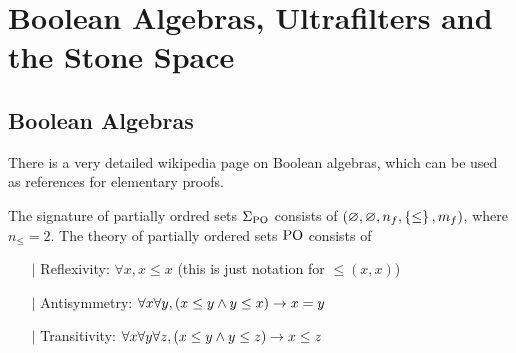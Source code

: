 \section{Boolean Algebras, Ultrafilters and the Stone Space}
\subsection{Boolean Algebras}
There is a very detailed wikipedia page \cite{wiki0} on Boolean algebras,
which can be used as references for elementary proofs.

\begin{dfn}
    The signature of partially ordred sets $\Sigma_{\mathrm{PO}}$ consists of 
    $(\varnothing,\varnothing ,n_f,\left\{\leq\right\},m_f)$,
    where $n_\leq = 2$.
    The theory of partially ordered sets $\mathrm{PO}$ consists of 
    \begin{itemize}
        \item[$\vert$] Reflexivity: 
            $\forall x, 
            x \leq x$ (this is just notation for $\leq(x,x)$)
        \item[$\vert$] Antisymmetry: 
            $\forall x \forall y, 
            (x \leq y \land y \leq x) \to x = y$
        \item[$\vert$] Transitivity:
            $\forall x \forall y \forall z, 
            (x \leq y \land y \leq z) \to x \leq z$
    \end{itemize}
\end{dfn}

